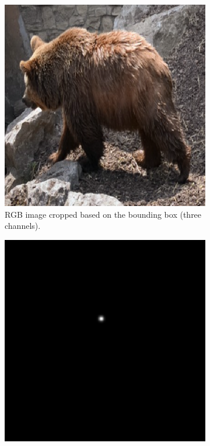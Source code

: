 \begin{figure}
	\centering
	\begin{subfigure}[b]{0.3\textwidth}
		\centering
		\includegraphics[width=\textwidth]{figures/chap34_channel_rgb.png}
		\caption{RGB image cropped based on the bounding box (three channels).}
		\label{fig:ch3:sec4:rgb_channel}
	\end{subfigure}
	\hfill
	\begin{subfigure}[b]{0.3\textwidth}
		\centering
		\includegraphics[width=\textwidth]{figures/chap34_channel_fg.png}

\end{subfigure}
\end{figure}
